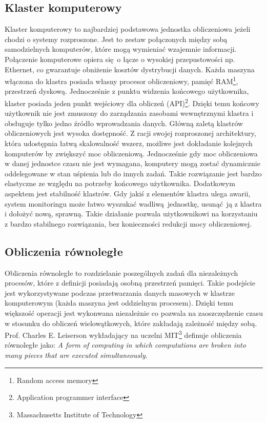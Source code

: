 \subsection{Klaster komputerowy}
Klaster komputerowy to najbardziej podstawowa jednostka obliczeniowa jeżeli chodzi o systemy rozproszone. Jest to zestaw połączonych między sobą samodzielnych komputerów, które mogą wymieniać wzajemnie informacji. Połączenie komputerowe opiera się o łącze o wysokiej przepustowości np. Ethernet, co gwarantuje obniżenie kosztów dystrybucji danych. Każda maszyna włączona do klastra posiada własny procesor obliczeniowy, pamięć RAM\footnote{Random access memory}, przestrzeń dyskową. Jednocześnie z punktu widzenia końcowego użytkownika, klaster posiada jeden punkt wejściowy dla obliczeń (API)\footnote{Application programmer interface}. Dzięki temu końcowy użytkownik nie jest zmuszony do zarządzania zasobami wewnętrznymi klastra i obsługuje tylko jedno źródło wprowadzania danych.\cite{cluster_grid_cloud} 
\newline Główną zaletą klastrów obliczeniowych jest wysoka dostępność. Z racji swojej rozproszonej architektury, która udostępnia łatwą skalowalność wszerz, możliwe jest dokładanie kolejnych komputerów by zwiększyć moc obliczeniową. Jednocześnie gdy moc obliczeniowa w danej jednostce czasu nie jest wymagana, komputery mogą zostać dynamicznie oddelegowane w stan uśpienia lub do innych zadań. Takie rozwiązanie jest bardzo elastyczne ze względu na potrzeby końcowego użytkownika. Dodatkowym aspektem jest stabilność klastrów. Gdy jakiś z elementów klastra ulega awarii, system monitoringu może łatwo wyszukać wadliwą jednostkę, usunąć ją z klastra i dołożyć nową, sprawną. Takie działanie pozwala użytkownikowi na korzystaniu z bardzo stabilnego rozwiązania, bez konieczności redukcji mocy obliczeniowej.\cite{cluster_grid_cloud_detailed_comparison}
\subsection{Obliczenia równoległe}
Obliczenia równoległe to rozdzielanie poszególnych zadań dla niezależnych procesów, które z definicji posiadają osobną przestrzeń pamięci. Takie podejście jest wykorzystywane podczas przetwarzania danych masowych w klastrze komputerowym (każda maszyna jest oddzielnym procesem). Dzięki temu większość operacji jest wykonwana niezależnie co pozwala na zaoszczędzenie czasu w stosunku do obliczeń wielowątkowych, które zakładają zależność między sobą. Prof. Charles E. Leiserson wykładający na uczelni MIT\footnote{Massachusetts Institute of Technology} definuje obliczenia równoległe jako:
\newline \textit{A form of computing in which computations are broken into many pieces that are executed simultaneously}.\cite{mit_presentation}
